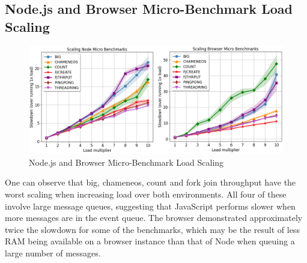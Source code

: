 \documentclass[oneside]{um-fict}
\begin{document}
\subsection{Node.js and Browser Micro-Benchmark Load Scaling}
\begin{figure}[H]
    \begin{centering}
        \includegraphics[width=\textwidth]{resources/load_scaling.png}
        \caption{Node.js and Browser Micro-Benchmark Load Scaling}\label{fig:load_scaling}
    \end{centering}
\end{figure}
One can observe that big, chameneos, count and fork join throughput have the worst scaling when increasing load over both environments. All four of these involve large message queues, suggesting that JavaScript performs slower when more messages are in the event queue. The browser demonstrated approximately twice the slowdown for some of the benchmarks, which may be the result of less RAM being available on a browser instance than that of Node when queuing a large number of messages.
\end{document}
